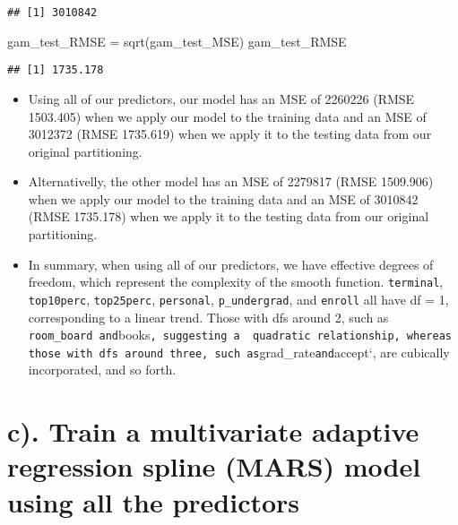 \documentclass[
]{article}
\newenvironment{Shaded}{\begin{snugshade}}{\end{snugshade}}
\newcommand{\FunctionTok}[1]{\textcolor[rgb]{0.00,0.00,0.00}{#1}}
\newcommand{\NormalTok}[1]{#1}
\newcommand{\OtherTok}[1]{\textcolor[rgb]{0.56,0.35,0.01}{#1}}
\begin{document}
\begin{verbatim}
## [1] 3010842
\end{verbatim}

\begin{Shaded}
\begin{Highlighting}[]
\NormalTok{gam\_test\_RMSE }\OtherTok{=} \FunctionTok{sqrt}\NormalTok{(gam\_test\_MSE)}
\NormalTok{gam\_test\_RMSE}
\end{Highlighting}
\end{Shaded}

\begin{verbatim}
## [1] 1735.178
\end{verbatim}

\begin{itemize}
\item
  Using all of our predictors, our model has an MSE of 2260226 (RMSE
  1503.405) when we apply our model to the training data and an MSE of
  3012372 (RMSE 1735.619) when we apply it to the testing data from our
  original partitioning.
\item
  Alternativelly, the other model has an MSE of 2279817 (RMSE 1509.906)
  when we apply our model to the training data and an MSE of 3010842
  (RMSE 1735.178) when we apply it to the testing data from our original
  partitioning.
\item
  In summary, when using all of our predictors, we have effective
  degrees of freedom, which represent the complexity of the smooth
  function. \texttt{terminal}, \texttt{top10perc}, \texttt{top25perc},
  \texttt{personal}, \texttt{p\_undergrad}, and \texttt{enroll} all have
  df = 1, corresponding to a linear trend. Those with dfs around 2, such
  as
  \texttt{room\_board\textasciigrave{}\textasciigrave{}\ and}books\texttt{,\ suggesting\ a\ \ quadratic\ relationship,\ whereas\ those\ with\ dfs\ around\ three,\ such\ as}grad\_rate\texttt{and}accept`,
  are cubically incorporated, and so forth.
\end{itemize}

\hypertarget{c.-train-a-multivariate-adaptive-regression-spline-mars-model-using-all-the-predictors}{%
\section{c). Train a multivariate adaptive regression spline (MARS)
model using all the
predictors}\label{c.-train-a-multivariate-adaptive-regression-spline-mars-model-using-all-the-predictors}}
\end{document}
